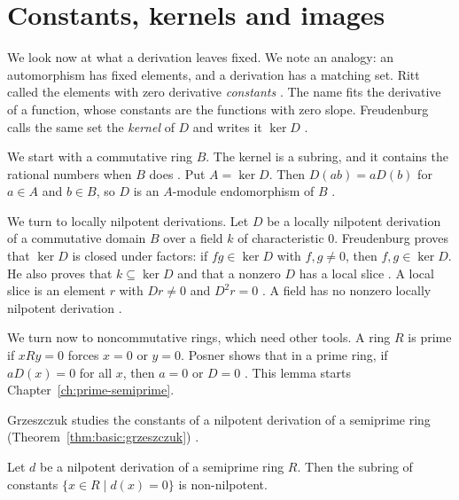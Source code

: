 \section{Constants, kernels and images}\label{sec:basic-theory:constants-kernels}

We look now at what a derivation leaves fixed. We note an analogy: an automorphism has fixed elements, and a derivation has a matching set. Ritt called the elements with
zero derivative \emph{constants} \cite[p.~1]{Ritt1950}. The name fits the
derivative of a function, whose constants are the functions with zero slope.
Freudenburg calls the same set the \emph{kernel} of $D$ and writes it
$\ker D$ \cite[p.~2]{Freudenburg2017}.

We start with a commutative ring $B$. The kernel is a subring,
and it contains the rational numbers when $B$ does
\cite[(C.3), (C.4), p.~2]{Freudenburg2017}. Put $A = \ker D$. Then
$D(ab) = aD(b)$ for $a \in A$ and $b \in B$, so $D$ is an $A$-module
endomorphism of $B$ \cite[Proposition~1.6(a), p.~13]{Freudenburg2017}.

We turn to locally nilpotent derivations. Let $D$ be a locally
nilpotent derivation of a commutative domain $B$ over a field $k$ of
characteristic $0$. Freudenburg proves that $\ker D$ is closed under factors:
if $fg \in \ker D$ with $f, g \neq 0$, then $f, g \in \ker D$. He also proves that
$k \subseteq \ker D$ and that a nonzero $D$ has a local slice
\cite[Principle~1, p.~21]{Freudenburg2017}. A local slice is an element $r$ with
$Dr \neq 0$ and $D^2r = 0$ \cite[p.~3]{Freudenburg2017}. A
field has no nonzero locally nilpotent derivation
\cite[Corollary~1.22, p.~22]{Freudenburg2017}.

We turn now to noncommutative rings, which need other tools. A ring $R$ is prime if $xRy = 0$ forces
$x = 0$ or $y = 0$. Posner shows that in a prime ring, if $aD(x) = 0$ for all
$x$, then $a = 0$ or $D = 0$ \cite[Lemma~1, p.~1093]{Posner1957}. This lemma
starts Chapter~\ref{ch:prime-semiprime}.

Grzeszczuk studies the constants of a nilpotent derivation of a semiprime ring (Theorem~\ref{thm:basic:grzeszczuk})
\cite[p.~1857]{Grzeszczuk1993}.\begin{theorem}\label{thm:basic:grzeszczuk}
Let $d$ be a nilpotent derivation of a semiprime ring $R$. Then the subring of
constants $\{x\in R \mid d(x)=0\}$ is non-nilpotent.
\end{theorem}


